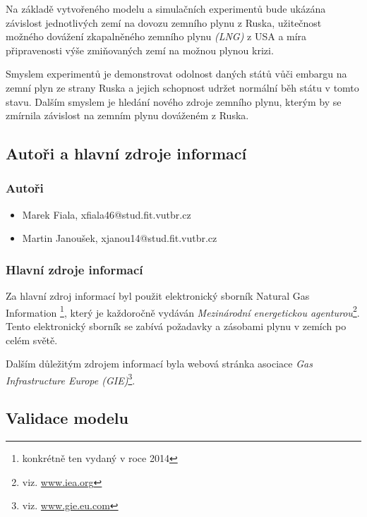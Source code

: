\documentclass[a4paper,11pt]{article}
\begin{document}
Na základě vytvořeného modelu a simulačních experimentů bude ukázána závislost jednotlivých zemí na dovozu zemního plynu z Ruska, 
užitečnost možného dovážení zkapalněného zemního plynu \textit{(LNG)} z USA a míra připravenosti výše zmiňovaných zemí na možnou plynou krizi.

Smyslem experimentů je demonstrovat odolnost daných států vůči embargu na zemní plyn ze strany Ruska a jejich schopnost udržet normální běh státu v tomto stavu.
Dalším smyslem je hledání nového zdroje zemního plynu, kterým by se zmírnila závislost
na zemním plynu dováženém z Ruska.


\subsection{Autoři a hlavní zdroje informací}
\subsubsection{Autoři}


\begin{itemize}
\item Marek Fiala, xfiala46@stud.fit.vutbr.cz
\item Martin Janoušek, xjanou14@stud.fit.vutbr.cz
\end{itemize}

\subsubsection{Hlavní zdroje informací}
Za hlavní zdroj informací byl použit elektronický sborník Natural Gas Information \cite{IEA}\footnote{konkrétně ten vydaný v roce 2014},
který je každoročně vydáván \textit{Mezinárodní energetickou agenturou}\footnote{viz. \url{www.iea.org}}.
Tento elektronický sborník se zabívá požadavky a zásobami plynu v zemích po celém světě.


Dalším důležitým zdrojem informací byla webová stránka asociace \textit{Gas Infrastructure Europe (GIE)}\footnote{viz. \url{www.gie.eu.com}}.

\subsection{Validace modelu}
\end{document}
